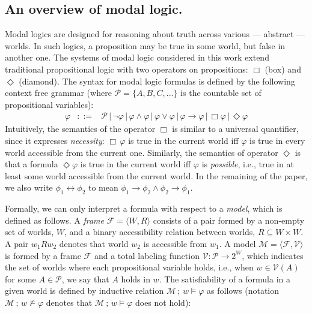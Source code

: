 \documentclass[3p,times]{elsarticle}
\begin{document}
\subsection{An overview of modal logic.} Modal logics are designed for reasoning
about truth across various --- abstract --- worlds. In such logics, a
proposition may be true in some world, but false in another one. The systems of
modal logic considered in this work extend traditional propositional logic
with two operators on propositions: $\Box$ (box) and $\Diamond$ (diamond).
The syntax for modal logic formulas is defined by the following context free
grammar (where
$\mathcal{P} = \{A,B,C,...\}$ is the countable set of propositional variables):
\[
  \begin{array}{lcl}
    \varphi & ::= & \mathcal{P}\,|\,\neg\varphi\,|\,\varphi\land\varphi\,|\,\varphi\lor\varphi\,|\,\varphi\to\varphi\,|\,\Box\varphi\,|\,\Diamond\varphi
  \end{array}
\]
Intuitively, the semantics of the operator $\Box$ is similar to a universal
quantifier, since it expresses \emph{necessity}: $\Box\,\varphi$ is true in the
current world iff $\varphi$ is true in every world accessible from the current
one. Similarly, the semantics of operator
$\Diamond$ is that a formula $\Diamond\varphi$ is true in the current
world iff $\varphi$ is \emph{possible}, i.e., true in at least some world
accessible from the current world. In the remaining of the paper, we also write
$\phi_1\leftrightarrow\phi_2$ to mean $\phi_1\to\phi_2\land\phi_2\to\phi_1$.

Formally, we can only interpret a formula with respect to a \emph{model}, which is
defined as follows.
A \emph{frame} $\mathcal{F} = \langle W, R \rangle$ \linebreak consists of a pair formed by
a non-empty set of worlds, $W$, and a binary accessibility relation between
worlds,
\linebreak
$R \subseteq W \times W$. A pair $w_1Rw_2$ denotes that world $w_2$ is
accessible from $w_1$. A model $\mathcal{M} = \langle \mathcal{F}, \mathcal{V} \rangle$
is formed by a frame $\mathcal{F}$ and a total labeling function
$\mathcal{V} : \mathcal{P}\to 2^W$, which indicates the set of worlds where each propositional variable holds, i.e., when $w \in \mathcal{V}(A)$
for some $A \in\mathcal{P}$, we say that $A$ holds in $w$. The satisfiability of a formula
in a given world is defined by inductive relation $\mathcal{M}\,;\,w\models \varphi$ as
follows (notation $\mathcal{M}\,;\,w\not\models \varphi$ denotes
that $\mathcal{M}\,;\,w\models \varphi$ does not hold):
\end{document}

